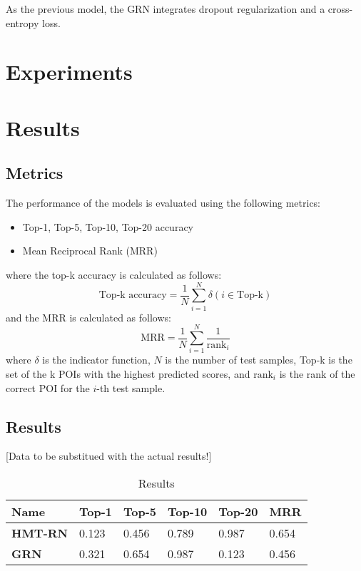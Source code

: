 \documentclass[twocolumn]{article}
\begin{document}
As the previous model, the GRN integrates dropout regularization and a
cross-entropy loss.
\section{Experiments}
\section{Results}
\subsection{Metrics}
The performance of the models is evaluated using the following metrics:
\begin{itemize}
    \item Top-1, Top-5, Top-10, Top-20 accuracy
    \item Mean Reciprocal Rank (MRR)
\end{itemize}
where the top-k accuracy is calculated as follows:
\begin{equation}
    \text{Top-k accuracy} = \frac{1}{N} \sum_{i=1}^{N} \delta(i \in \text{Top-k})
\end{equation}
and the MRR is calculated as follows:
\begin{equation}
    \text{MRR} = \frac{1}{N} \sum_{i=1}^{N} \frac{1}{\text{rank}_i}
\end{equation}
where $\delta$ is the indicator function, $N$ is the number of test samples, Top-k is the set of the k
POIs with the highest predicted scores,
and $\text{rank}_i$ is the rank of the correct POI for the $i$-th test sample.
\subsection{Results}
[Data to be substitued with the actual results!]
\begin{table}
  \caption{Results}
   \centering
   \begin{tabular}{llllll}
     \toprule
      Name     & Top-1 & Top-5 & Top-10 & Top-20 & MRR \\
      \midrule
      \cmidrule(r){2-6}
      \textbf{HMT-RN}   & 0.123 & 0.456 & 0.789  & 0.987 & 0.654 \\
      \textbf{GRN}      & 0.321 & 0.654 & 0.987  & 0.123 & 0.456 \\

     \bottomrule
   \end{tabular}
   \label{tab:table}
 \end{table}
\end{document}
